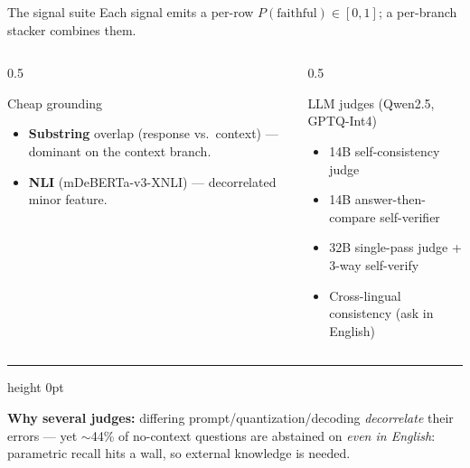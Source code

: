 \documentclass[aspectratio=169,11pt,t]{beamer}
\begin{document}
\begin{frame}{The signal suite}
  Each signal emits a per-row $P(\text{faithful})\in[0,1]$; a per-branch stacker combines them.
  \vspace{0.5em}
  \begin{columns}[T]
    \begin{column}{0.5\textwidth}
      \begin{block}{Cheap grounding}
        \begin{itemize}
          \item \textbf{Substring} overlap (response vs.\ context) — dominant on the context branch.
          \item \textbf{NLI} (mDeBERTa-v3-XNLI) — decorrelated minor feature.
        \end{itemize}
      \end{block}
    \end{column}
    \begin{column}{0.5\textwidth}
      \begin{block}{LLM judges (Qwen2.5, GPTQ-Int4)}
        \begin{itemize}
          \item 14B self-consistency judge
          \item 14B answer-then-compare self-verifier
          \item 32B single-pass judge + 3-way self-verify
          \item Cross-lingual consistency (ask in English)
        \end{itemize}
      \end{block}
    \end{column}
  \end{columns}
  \vspace{0.15em}
  \hrule height 0pt
  \begin{center}\begin{minipage}{0.95\textwidth}
    \footnotesize\color{soft} \textbf{\color{primary}Why several judges:} differing prompt/quantization/decoding \emph{decorrelate} their errors — yet $\sim$44\% of no-context questions are abstained on \emph{even in English}: parametric recall hits a wall, so external knowledge is needed.
  \end{minipage}\end{center}
\end{frame}
\end{document}
